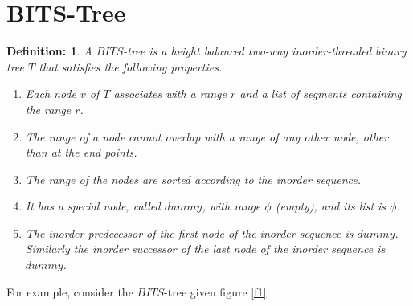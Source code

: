 \documentclass{article}
\newtheorem{definition}{Definition:}
\begin{document}
\section{BITS-Tree}
\begin{definition}
A $BITS$-tree is a height balanced two-way inorder-threaded binary tree $T$ that satisfies the following properties.
\begin{enumerate}
\itemsep=0pt
\parskip=0pt
	\item Each node $v$ of $T$ associates with a range $r$ and a list of segments containing the range $r$.
	\item The range of a node cannot overlap with a range of any other node, other than at the end points. 
	\item The range of the nodes are sorted according to the inorder sequence. 
	\item It has a special node, called $dummy$, with range $\phi$ (empty), and its list is $\phi$. 
	\item The inorder predecessor of the first node of the inorder sequence is $dummy$. Similarly the inorder successor of the last node of the inorder sequence is $dummy$.
\end{enumerate}
\end{definition}
\par
For example, consider the $BITS$-tree given figure \ref{f1}.
\end{document}
